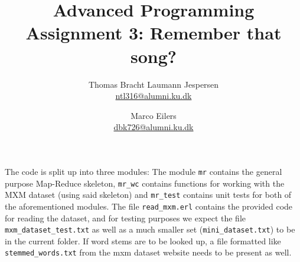 \documentclass[a4paper]{article}
\title{Advanced Programming\\ Assignment 3: Remember that song?}
\author{Thomas Bracht Laumann Jespersen\\ \url{ntl316@alumni.ku.dk} \and Marco Eilers\\ \url{dbk726@alumni.ku.dk} }
\begin{document}
\maketitle

The code is split up into three modules: The module \texttt{mr}
 contains the general purpose Map-Reduce skeleton, \texttt{mr\_wc} contains functions for working with the MXM dataset
 (using said skeleton) and \texttt{mr\_test} contains
  unit tests for both of the aforementioned modules. The file \texttt{read\_mxm.erl} contains the provided code for reading the dataset, and for testing purposes we expect the file \texttt{mxm\_dataset\_test.txt} as well as a much smaller set (\texttt{mini\_dataset.txt}) to be in the current folder. If word stems are to be looked up, a file formatted like \texttt{stemmed\_words.txt} from the mxm dataset website needs to be present as well.
\end{document}

